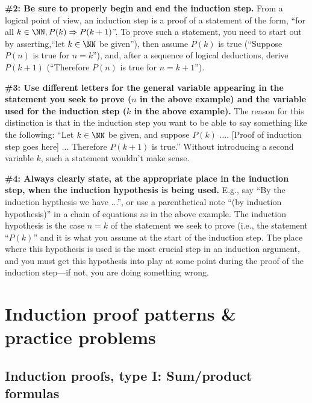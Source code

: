 \noindent
\textbf{\#2: Be sure to properly begin and end the induction step.} 
From a logical point of view, an induction step is a proof of a statement of the
form, ``for all  $ k\in\NN, P(k)\Rightarrow P(k+1)$''. To prove such a statement,
you need to start out by asserting,``let $k\in \NN$ be
given''), then assume $P(k)$ is true (``Suppose $P(n)$ is true for $n=k$''), 
and, after a sequence of logical deductions, derive $P(k+1)$ (``Therefore
$P(n)$ is true for $n=k+1$''). 

\noindent
 \textbf{\#3: Use different letters for the general variable appearing in the
statement you seek to prove ($n$ in the above example)
and the variable used for the induction step 
($k$ in the above example).} 
The reason for this distinction is that in the induction step 
you want to be able to say something like the following:
``Let $k\in\NN$ be given, and suppose $P(k)$ .... 
[Proof of induction step goes here] ...  
Therefore $P(k+1)$ is true.''  Without introducing a second variable
$k$, such a statement wouldn't make sense.

\noindent
\textbf{\#4: Always clearly state, at the appropriate place in the induction step,
when the induction hypothesis is being used.} E.g., say
``By the induction hypthesis we have ...'', or use a parenthetical
note ``(by induction hypothesis)'' in a chain of equations as in the above
example.  The induction hypothesis is the case $n=k$ of the statement we seek
to prove (i.e., the statement ``$P(k)$'' and it is what you assume at the
start of the induction step.  The place where this hypothesis is used is the
most crucial step in an induction argument, and you must get this hypothesis into
play at some point during the proof of the induction step---if not, you are
doing something wrong. 


\section{Induction proof patterns \& practice problems}
\label{sec:Induction:ProofPatternsAndPractice}
 



\subsection*{Induction proofs, type I: Sum/product formulas}
 
